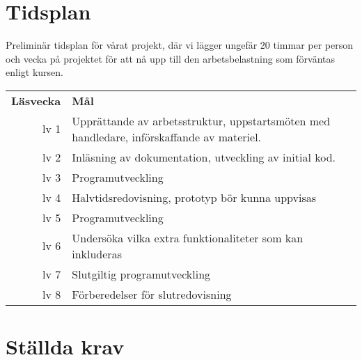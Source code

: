 \documentclass[a4paper]{article}
\begin{document}

	\section{Tidsplan} %
	\label{sec:section_name}
		Preliminär tidsplan för vårat projekt, där vi lägger ungefär 20 timmar per person och vecka på projektet för att nå upp till den arbetsbelastning som förväntas enligt kursen. \\

		\noindent\begin{tabularx}{\textwidth}{@{}rX}
			\textbf{Läsvecka} & \textbf{Mål}\\
			lv 1 &	Upprättande av arbetsstruktur, uppstartsmöten med handledare, införskaffande av materiel. \\
			lv 2 & Inläsning av dokumentation, utveckling av initial kod. \\
			lv 3 & Programutveckling\\
			lv 4 & Halvtidsredovisning, prototyp bör kunna uppvisas\\
			lv 5 & Programutveckling\\
			lv 6 & Undersöka vilka extra funktionaliteter som kan inkluderas\\
			lv 7 & Slutgiltig programutveckling\\
			lv 8 & Förberedelser för slutredovisning \\
		\end{tabularx}

	\newpage

	\section{Ställda krav} %
	\label{sub:stallda_krav}
\end{document}

